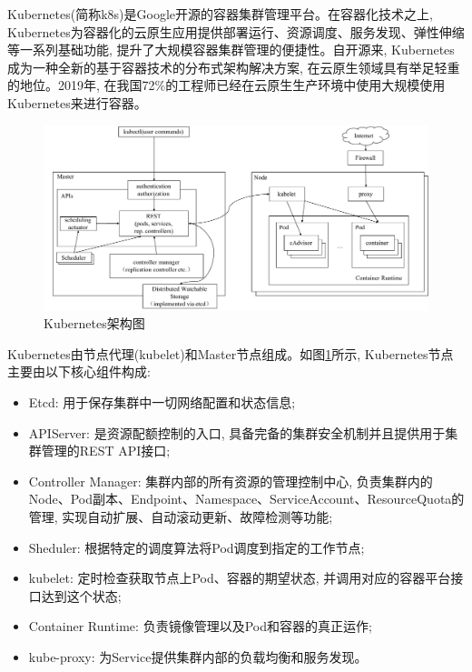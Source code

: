 Kubernetes(简称k8s)是Google开源的容器集群管理平台。在容器化技术之上, Kubernetes为容器化的云原生应用提供部署运行、资源调度、服务发现、弹性伸缩等一系列基础功能, 提升了大规模容器集群管理的便捷性。自开源来, Kubernetes成为一种全新的基于容器技术的分布式架构解决方案, 在云原生领域具有举足轻重的地位。2019年, 在我国72\%的工程师已经在云原生生产环境中使用大规模使用Kubernetes来进行容器\footnotemark[1]。

\begin{figure}[h] %
    \centering %
    \includegraphics[width=1.0\textwidth]{FIGs/chapter2/k8s.pdf} %
    \caption{Kubernetes架构图} %
    \label{k8s} %
\end{figure}%

Kubernetes由节点代理(kubelet)和Master节点组成。如图\ref{k8s}所示, Kubernetes节点主要由以下核心组件构成:

\begin{itemize}[itemindent=2em]
    \item Etcd: 用于保存集群中一切网络配置和状态信息;

    \item APIServer: 是资源配额控制的入口, 具备完备的集群安全机制并且提供用于集群管理的REST API接口;

    \item Controller Manager: 集群内部的所有资源的管理控制中心, 负责集群内的Node、Pod副本、Endpoint、Namespace、ServiceAccount、ResourceQuota的管理, 实现自动扩展、自动滚动更新、故障检测等功能;

    \item Sheduler: 根据特定的调度算法将Pod调度到指定的工作节点;

    \item kubelet: 定时检查获取节点上Pod、容器的期望状态, 并调用对应的容器平台接口达到这个状态;

    \item Container Runtime: 负责镜像管理以及Pod和容器的真正运作\cite{wangjunxiang2018};

    \item kube-proxy: 为Service提供集群内部的负载均衡和服务发现。
\end{itemize}

